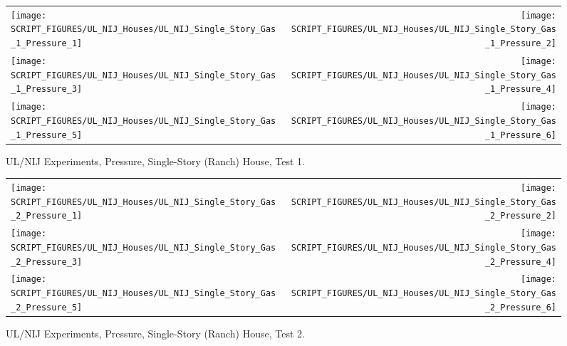 \begin{figure}[p]
\begin{tabular*}{\textwidth}{l@{\extracolsep{\fill}}r}
\texttt{[image: SCRIPT\_FIGURES/UL\_NIJ\_Houses/UL\_NIJ\_Single\_Story\_Gas\_1\_Pressure\_1]} &
\texttt{[image: SCRIPT\_FIGURES/UL\_NIJ\_Houses/UL\_NIJ\_Single\_Story\_Gas\_1\_Pressure\_2]} \\
\texttt{[image: SCRIPT\_FIGURES/UL\_NIJ\_Houses/UL\_NIJ\_Single\_Story\_Gas\_1\_Pressure\_3]} &
\texttt{[image: SCRIPT\_FIGURES/UL\_NIJ\_Houses/UL\_NIJ\_Single\_Story\_Gas\_1\_Pressure\_4]} \\
\texttt{[image: SCRIPT\_FIGURES/UL\_NIJ\_Houses/UL\_NIJ\_Single\_Story\_Gas\_1\_Pressure\_5]} &
\texttt{[image: SCRIPT\_FIGURES/UL\_NIJ\_Houses/UL\_NIJ\_Single\_Story\_Gas\_1\_Pressure\_6]} \\
\end{tabular*}
\caption[UL/NIJ Experiments, Pressure, Single-Story (Ranch) House, Test 1]{UL/NIJ Experiments, Pressure, Single-Story (Ranch) House, Test 1.}
\label{UL_NIJ_Pres_Ranch_1}
\end{figure}

\begin{figure}[p]
\begin{tabular*}{\textwidth}{l@{\extracolsep{\fill}}r}
\texttt{[image: SCRIPT\_FIGURES/UL\_NIJ\_Houses/UL\_NIJ\_Single\_Story\_Gas\_2\_Pressure\_1]} &
\texttt{[image: SCRIPT\_FIGURES/UL\_NIJ\_Houses/UL\_NIJ\_Single\_Story\_Gas\_2\_Pressure\_2]} \\
\texttt{[image: SCRIPT\_FIGURES/UL\_NIJ\_Houses/UL\_NIJ\_Single\_Story\_Gas\_2\_Pressure\_3]} &
\texttt{[image: SCRIPT\_FIGURES/UL\_NIJ\_Houses/UL\_NIJ\_Single\_Story\_Gas\_2\_Pressure\_4]} \\
\texttt{[image: SCRIPT\_FIGURES/UL\_NIJ\_Houses/UL\_NIJ\_Single\_Story\_Gas\_2\_Pressure\_5]} &
\texttt{[image: SCRIPT\_FIGURES/UL\_NIJ\_Houses/UL\_NIJ\_Single\_Story\_Gas\_2\_Pressure\_6]} \\
\end{tabular*}
\caption[UL/NIJ Experiments, Pressure, Single-Story (Ranch) House, Test 2]{UL/NIJ Experiments, Pressure, Single-Story (Ranch) House, Test 2.}
\label{UL_NIJ_Pres_Ranch_2}
\end{figure}


